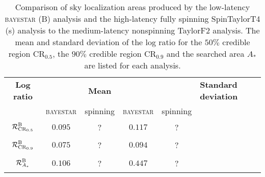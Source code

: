 \begin{table}
\begin{tabular}{ccccc}
\textbf{Log ratio} & & \textbf{Mean} & & & \textbf{Standard deviation} & \\   
 & \textsc{bayestar} & spinning & \textsc{bayestar} & spinning \\
$\displaystyle \vphantom{\frac{0}{0}} \mathcal{R}^\mathrm{B}_{\mathrm{CR}_{0.5}}$ & $0.095$ & ? & $0.117$  & ? \\
$\displaystyle \vphantom{\frac{0}{0}} \mathcal{R}^\mathrm{B}_{\mathrm{CR}_{0.9}}$ & $0.075$ & ? & $0.094$ & ? \\
$\displaystyle \vphantom{\frac{0}{0}} \mathcal{R}^\mathrm{B}_{A_\ast}$ & $0.106$ & ? & $0.447$ & ?
\end{tabular}
\caption{\label{tab:sky-ratio} Comparison of sky localization areas produced by the low-latency \textsc{bayestar} (B) analysis and the high-latency fully spinning SpinTaylorT4 (s) analysis to the medium-latency nonspinning TaylorF2 analysis. The mean and standard deviation of the log ratio for the $50\%$ credible region $\mathrm{CR}_{0.5}$, the $90\%$ credible region $\mathrm{CR}_{0.9}$ and the searched area $A_\ast$ are listed for each analysis.}

\end{table}